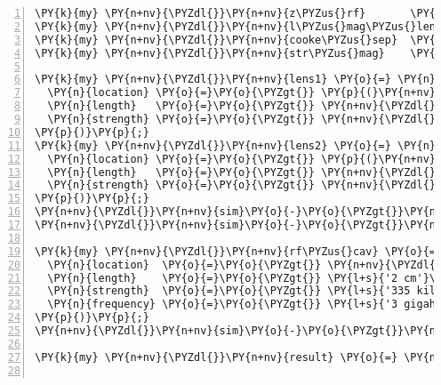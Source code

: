\begin{Verbatim}[commandchars=\\\{\},numbers=left,firstnumber=1,stepnumber=1]
\PY{k}{my} \PY{n+nv}{\PYZdl{}}\PY{n+nv}{z\PYZus{}rf}       \PY{o}{=} \PY{l+m+mi}{20}\PY{p}{;} \PY{c+c1}{\PYZsh{}cm}
\PY{k}{my} \PY{n+nv}{\PYZdl{}}\PY{n+nv}{l\PYZus{}mag\PYZus{}lens} \PY{o}{=} \PY{l+s}{'1 in'}\PY{p}{;}
\PY{k}{my} \PY{n+nv}{\PYZdl{}}\PY{n+nv}{cooke\PYZus{}sep}  \PY{o}{=} \PY{l+m+mi}{5}\PY{p}{;} \PY{c+c1}{\PYZsh{}cm}
\PY{k}{my} \PY{n+nv}{\PYZdl{}}\PY{n+nv}{str\PYZus{}mag}    \PY{o}{=} \PY{l+m+mf}{43e-13}\PY{p}{;}

\PY{k}{my} \PY{n+nv}{\PYZdl{}}\PY{n+nv}{lens1} \PY{o}{=} \PY{n}{MagneticLens}\PY{o}{-}\PY{o}{\PYZgt{}}\PY{k}{new}\PY{p}{(}
  \PY{n}{location} \PY{o}{=}\PY{o}{\PYZgt{}} \PY{p}{(}\PY{n+nv}{\PYZdl{}}\PY{n+nv}{z\PYZus{}rf} \PY{o}{-} \PY{n+nv}{\PYZdl{}}\PY{n+nv}{cooke\PYZus{}sep}\PY{p}{)} \PY{o}{.} \PY{l+s}{'cm'}\PY{p}{,}
  \PY{n}{length}   \PY{o}{=}\PY{o}{\PYZgt{}} \PY{n+nv}{\PYZdl{}}\PY{n+nv}{l\PYZus{}mag\PYZus{}lens}\PY{p}{,}
  \PY{n}{strength} \PY{o}{=}\PY{o}{\PYZgt{}} \PY{n+nv}{\PYZdl{}}\PY{n+nv}{str\PYZus{}mag}\PY{p}{,}
\PY{p}{)}\PY{p}{;}
\PY{k}{my} \PY{n+nv}{\PYZdl{}}\PY{n+nv}{lens2} \PY{o}{=} \PY{n}{MagneticLens}\PY{o}{-}\PY{o}{\PYZgt{}}\PY{k}{new}\PY{p}{(}
  \PY{n}{location} \PY{o}{=}\PY{o}{\PYZgt{}} \PY{p}{(}\PY{n+nv}{\PYZdl{}}\PY{n+nv}{z\PYZus{}rf} \PY{o}{+} \PY{n+nv}{\PYZdl{}}\PY{n+nv}{cooke\PYZus{}sep}\PY{p}{)} \PY{o}{.} \PY{l+s}{'cm'}\PY{p}{,}
  \PY{n}{length}   \PY{o}{=}\PY{o}{\PYZgt{}} \PY{n+nv}{\PYZdl{}}\PY{n+nv}{l\PYZus{}mag\PYZus{}lens}\PY{p}{,}
  \PY{n}{strength} \PY{o}{=}\PY{o}{\PYZgt{}} \PY{n+nv}{\PYZdl{}}\PY{n+nv}{str\PYZus{}mag}\PY{p}{,}
\PY{p}{)}\PY{p}{;}
\PY{n+nv}{\PYZdl{}}\PY{n+nv}{sim}\PY{o}{-}\PY{o}{\PYZgt{}}\PY{n}{add\PYZus{}element}\PY{p}{(}\PY{n+nv}{\PYZdl{}}\PY{n+nv}{lens1}\PY{p}{)}\PY{p}{;}
\PY{n+nv}{\PYZdl{}}\PY{n+nv}{sim}\PY{o}{-}\PY{o}{\PYZgt{}}\PY{n}{add\PYZus{}element}\PY{p}{(}\PY{n+nv}{\PYZdl{}}\PY{n+nv}{lens2}\PY{p}{)}\PY{p}{;}

\PY{k}{my} \PY{n+nv}{\PYZdl{}}\PY{n+nv}{rf\PYZus{}cav} \PY{o}{=} \PY{n}{RFCavity}\PY{o}{-}\PY{o}{\PYZgt{}}\PY{k}{new}\PY{p}{(}
  \PY{n}{location}  \PY{o}{=}\PY{o}{\PYZgt{}} \PY{n+nv}{\PYZdl{}}\PY{n+nv}{z\PYZus{}rf} \PY{o}{.} \PY{l+s}{'cm'}\PY{p}{,}
  \PY{n}{length}    \PY{o}{=}\PY{o}{\PYZgt{}} \PY{l+s}{'2 cm'}\PY{p}{,}
  \PY{n}{strength}  \PY{o}{=}\PY{o}{\PYZgt{}} \PY{l+s}{'335 kilovolts / m'}\PY{p}{,}
  \PY{n}{frequency} \PY{o}{=}\PY{o}{\PYZgt{}} \PY{l+s}{'3 gigahertz'}\PY{p}{,}
\PY{p}{)}\PY{p}{;}
\PY{n+nv}{\PYZdl{}}\PY{n+nv}{sim}\PY{o}{-}\PY{o}{\PYZgt{}}\PY{n}{add\PYZus{}element}\PY{p}{(}\PY{n+nv}{\PYZdl{}}\PY{n+nv}{rf\PYZus{}cav}\PY{p}{)}\PY{p}{;}

\PY{k}{my} \PY{n+nv}{\PYZdl{}}\PY{n+nv}{result} \PY{o}{=} \PY{n}{pdl}\PY{p}{(} \PY{n+nv}{\PYZdl{}}\PY{n+nv}{sim}\PY{o}{-}\PY{o}{\PYZgt{}}\PY{n}{propagate} \PY{p}{)}\PY{p}{;}


\end{Verbatim}
